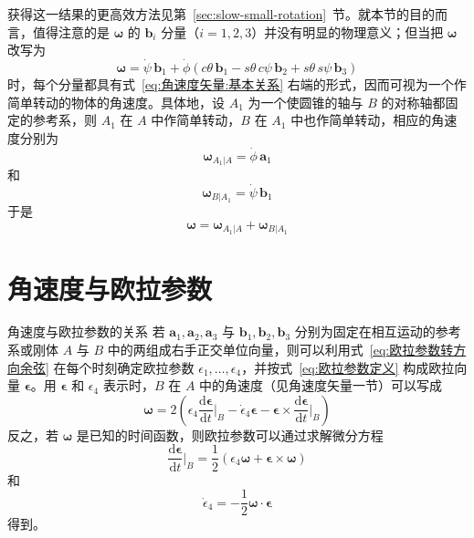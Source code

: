 \begin{example}
\begin{equation}
        \label{eq:角速度分量:圆锥角速度}
    \end{equation}
    获得这一结果的更高效方法见第~\ref{sec:slow-small-rotation}~节。就本节的目的而言，值得注意的是 $\bm{\omega}$ 的 $\mathbf{b}_i$ 分量（$i=1,2,3$）并没有明显的物理意义；但当把 $\bm{\omega}$ 改写为
    \begin{equation}
        \bm{\omega} = \dot{\psi}\,\mathbf{b}_1 + \dot{\phi}(c\theta\,\mathbf{b}_1 - s\theta\,c\psi\,\mathbf{b}_2 + s\theta\,s\psi\,\mathbf{b}_3)
        \label{eq:角速度分量:分解}
    \end{equation}
    时，每个分量都具有式~\eqref{eq:角速度矢量:基本关系} 右端的形式，因而可视为一个作简单转动的物体的角速度。具体地，设 $A_1$ 为一个使圆锥的轴与 $B$ 的对称轴都固定的参考系，则 $A_1$ 在 $A$ 中作简单转动，$B$ 在 $A_1$ 中也作简单转动，相应的角速度分别为
    \begin{equation}
        \bm{\omega}_{A_1|A} = \dot{\phi}\,\mathbf{a}_1
        \label{eq:角速度分量:A1角速度}
    \end{equation}
    和
    \begin{equation}
        \bm{\omega}_{B|A_1} = \dot{\psi}\,\mathbf{b}_1
        \label{eq:角速度分量:B角速度}
    \end{equation}
    于是
    \begin{equation}
        \bm{\omega} = \bm{\omega}_{A_1|A} + \bm{\omega}_{B|A_1}
        \label{eq:角速度分量:角速度合成}
    \end{equation}
\end{example}
\section{角速度与欧拉参数}
\begin{myTheorem}{角速度与欧拉参数的关系}
若 $\mathbf{a}_1,\mathbf{a}_2,\mathbf{a}_3$ 与 $\mathbf{b}_1,\mathbf{b}_2,\mathbf{b}_3$ 分别为固定在相互运动的参考系或刚体 $A$ 与 $B$ 中的两组成右手正交单位向量，则可以利用式~\eqref{eq:欧拉参数转方向余弦} 在每个时刻确定欧拉参数 $\epsilon_1,\dots,\epsilon_4$，并按式~\eqref{eq:欧拉参数定义} 构成欧拉向量 $\bm{\epsilon}$。用 $\bm{\epsilon}$ 和 $\epsilon_4$ 表示时，$B$ 在 $A$ 中的角速度（见角速度矢量一节）可以写成
\begin{equation}
    \bm{\omega} = 2\left(\epsilon_4\frac{\mathrm{d}\bm{\epsilon}}{\mathrm{d}t}\Big|_{B} - \dot{\epsilon}_4\bm{\epsilon} - \bm{\epsilon}\times\frac{\mathrm{d}\bm{\epsilon}}{\mathrm{d}t}\Big|_{B}\right)
    \label{eq:角速度欧拉:基本关系}
\end{equation}
反之，若 $\bm{\omega}$ 是已知的时间函数，则欧拉参数可以通过求解微分方程
\begin{equation}
    \frac{\mathrm{d}\bm{\epsilon}}{\mathrm{d}t}\Big|_{B} = \frac{1}{2}(\epsilon_4\bm{\omega} + \bm{\epsilon}\times\bm{\omega})
    \label{eq:角速度欧拉:微分方程}
\end{equation}
和
\begin{equation}
    \dot{\epsilon}_4 = -\frac{1}{2}\bm{\omega}\cdot\bm{\epsilon}
    \label{eq:角速度欧拉:epsilon4导数}
\end{equation}
得到。
\end{myTheorem}

